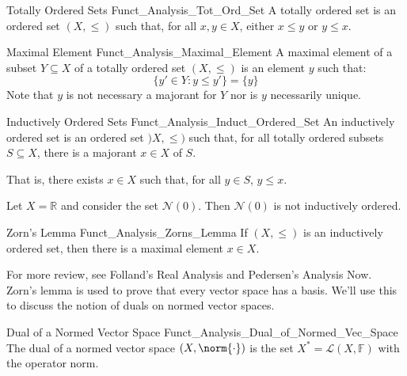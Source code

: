 \documentclass[crop=false,class=book,oneside]{standalone}                      %
\begin{document}
        \begin{ldefinition}{Totally Ordered Sets}
              {Funct_Analysis_Tot_Ord_Set}
            A totally ordered set is an ordered set
            $(X,\leq)$ such that, for all $x,y\in{X}$, either
            $x\leq{y}$ or $y\leq{x}$.
        \end{ldefinition}
        \begin{ldefinition}{Maximal Element}
              {Funct_Analysis_Maximal_Element}
            A maximal element of a subset $Y\subseteq{X}$ of
            a totally ordered set $(X,\leq)$ is an element $y$
            such that:
            \begin{equation}
                \{y'\in{Y}:y\leq{y}'\}=\{y\}
            \end{equation}
            Note that $y$ is not necessary a majorant for $Y$
            nor is $y$ necessarily unique.
        \end{ldefinition}
        \begin{ldefinition}{Inductively Ordered Sets}
              {Funct_Analysis_Induct_Ordered_Set}
            An inductively ordered set is an ordered set
            $)X,\leq)$ such that, for all totally ordered
            subsets $S\subseteq{X}$, there is a majorant
            $x\in{X}$ of $S$.
        \end{ldefinition}
        That is, there exists $x\in{X}$ such that, for all
        $y\in{S}$, $y\leq{x}$.
        \begin{lexample}
            Let $X=\mathbb{R}$ and consider the set
            $\mathscr{N}(0)$. Then $\mathscr{N}(0)$ is
            not inductively ordered.
        \end{lexample}
        \begin{ltheorem}{Zorn's Lemma}
              {Funct_Analysis_Zorns_Lemma}
            If $(X,\leq)$ is an inductively ordered set,
            then there is a maximal element $x\in{X}$.
        \end{ltheorem}
        For more review, see Folland's Real Analysis and
        Pedersen's Analysis Now. Zorn's lemma is used to
        prove that every vector space has a basis. We'll
        use this to discuss the notion of duals on
        normed vector spaces.
        \begin{ldefinition}{Dual of a Normed Vector Space}
              {Funct_Analysis_Dual_of_Normed_Vec_Space}
            The dual of a normed vector space $(X,\norm{\cdot})$
            is the set $X^{*}=\mathcal{L}(X,\mathbb{F})$
            with the operator norm.
        \end{ldefinition}
\end{document}
